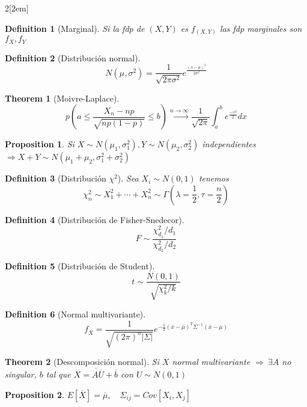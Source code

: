 \documentclass{myclass}
\newtheorem*{theorem}{Theorem}
\newtheorem*{proposition}{Proposition}
\newtheorem*{definition}{Definition}
\begin{document}
\begin{multicols}{2}[\columnsep2em]
\begin{definition}[Marginal]
Si la fdp de $(X, Y)$ es  $f_{(X, Y)}$ las fdp marginales son $f_X, f_Y$
\end{definition}

\begin{definition}[Distribución normal]
\[
N(\mu, \sigma^2) = \frac{1}{\sqrt{2\pi \sigma ^2} } e^{\frac{(x-\mu)^2}{2\sigma ^2}}
\] 
\end{definition}

\begin{theorem}[Moivre-Laplace]
\[
p\left( a\le \frac{X_n-np}{\sqrt{np(1-p)} } \le b \right) \xrightarrow{n\to \infty } \frac{1}{\sqrt{2\pi} }\int_a^b e^{\frac{-x^2}{2}}dx
\] 
\end{theorem}

\begin{proposition} Si $X \sim N(\mu_1, \sigma_1^2), Y \sim N(\mu_2, \sigma_2^2)$ independientes $\Rightarrow X+Y \sim N(\mu_1+\mu_2, \sigma_1^2+\sigma_2^2)$
\end{proposition}

\begin{definition}[Distribución $\chi^2$] Sea $X_i \sim  N(0, 1)$ tenemos
\[
\chi^2_n \sim  X_1^2 + \cdots + X_n^2 \sim \Gamma \left(\lambda=\frac{1}{2}, \tau = \frac{n}{2}\right)
\] 
\end{definition}

\begin{definition}[Distribución de Fisher-Snedecor]
  \[
 F \sim \frac{\chi_{d_1}^2 / d_1}{\chi_{d_2}^2 / d_2}
  \] 
\end{definition}

\begin{definition}[Distribución de Student]
\[
t \sim \frac{N(0,1)}{\sqrt{\chi_k^2 / k }}
\] 
\end{definition}

\begin{definition}[Normal multivariante]
\[
f_{\overline{X}} = \frac{1}{\sqrt{(2\pi)^n |\Sigma|} } e^{-\frac{1}{2}(\overline{x}-\overline{\mu})^T\Sigma^{-1} (\overline{x}-\overline{\mu})}
\] 
\end{definition}

\begin{theorem}[Descomposición normal]
Si $\overline{X}$ normal multivariante $\Rightarrow \ \exists A$ no singular, $b$ tal que $\overline{X = A\overline{U}+\overline{b}}$ con $U\sim N(0,1)$
\end{theorem}

\begin{proposition}
$E[\overline{X}] = \overline{\mu}, \quad \Sigma_{ij}=Cov[X_i, X_j]$ 
\end{proposition}


\end{multicols}
\end{document}
